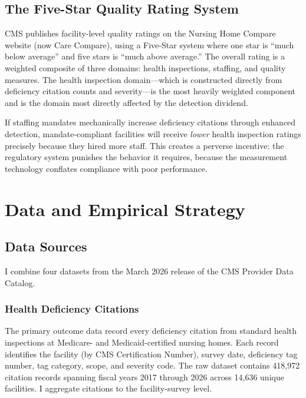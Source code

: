 \documentclass[12pt]{article}
\begin{document}
\subsection{The Five-Star Quality Rating System}

CMS publishes facility-level quality ratings on the Nursing Home Compare website (now Care Compare), using a Five-Star system where one star is ``much below average'' and five stars is ``much above average.'' The overall rating is a weighted composite of three domains: health inspections, staffing, and quality measures. The health inspection domain---which is constructed directly from deficiency citation counts and severity---is the most heavily weighted component and is the domain most directly affected by the detection dividend.

If staffing mandates mechanically increase deficiency citations through enhanced detection, mandate-compliant facilities will receive \textit{lower} health inspection ratings precisely because they hired more staff. This creates a perverse incentive: the regulatory system punishes the behavior it requires, because the measurement technology conflates compliance with poor performance.


\section{Data and Empirical Strategy}
\label{sec:data}

\subsection{Data Sources}

I combine four datasets from the March 2026 release of the CMS Provider Data Catalog.

\subsubsection{Health Deficiency Citations} The primary outcome data record every deficiency citation from standard health inspections at Medicare- and Medicaid-certified nursing homes. Each record identifies the facility (by CMS Certification Number), survey date, deficiency tag number, tag category, scope, and severity code. The raw dataset contains 418,972 citation records spanning fiscal years 2017 through 2026 across 14,636 unique facilities. I aggregate citations to the facility-survey level.
\end{document}
